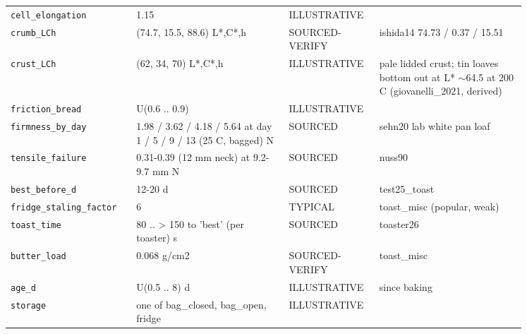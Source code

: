 \documentclass[10.5pt,a4paper]{article}
\begin{document}
{\begin{longtable}{@{}p{0.2\linewidth}p{0.27\linewidth}p{0.12\linewidth}p{0.26\linewidth}@{}}
\texttt{cell\_\allowbreak{}elongation} & 1.15 & ILLUSTRATIVE &  \\
\texttt{crumb\_\allowbreak{}LCh} & (74.7, 15.5, 88.6) L*,C*,h & SOURCED-VERIFY & ishida14 74.73 / 0.37 / 15.51 \\
\texttt{crust\_\allowbreak{}LCh} & (62, 34, 70) L*,C*,h & ILLUSTRATIVE & pale lidded crust; tin loaves bottom out at L* $\sim$64.5 at 200 C (giovanelli\_2021, derived) \\
\texttt{friction\_\allowbreak{}bread} & U(0.6 .. 0.9) & ILLUSTRATIVE &  \\
\texttt{firmness\_\allowbreak{}by\_\allowbreak{}day} & 1.98 / 3.62 / 4.18 / 5.64 at day 1 / 5 / 9 / 13 (25 C, bagged) N & SOURCED & sehn20 lab white pan loaf \\
\texttt{tensile\_\allowbreak{}failure} & 0.31-0.39 (12 mm neck) at 9.2-9.7 mm N & SOURCED & nuss90 \\
\texttt{best\_\allowbreak{}before\_\allowbreak{}d} & 12-20 d & SOURCED & test25\_toast \\
\texttt{fridge\_\allowbreak{}staling\_\allowbreak{}factor} & 6 & TYPICAL & toast\_misc (popular, weak) \\
\texttt{toast\_\allowbreak{}time} & 80 .. > 150 to 'best' (per toaster) s & SOURCED & toaster26 \\
\texttt{butter\_\allowbreak{}load} & 0.068 g/cm2 & SOURCED-VERIFY & toast\_misc \\
\texttt{age\_\allowbreak{}d} & U(0.5 .. 8) d & ILLUSTRATIVE & since baking \\
\texttt{storage} & one of bag\_closed, bag\_open, fridge & ILLUSTRATIVE &  \\\bottomrule\end{longtable}}
\end{document}
